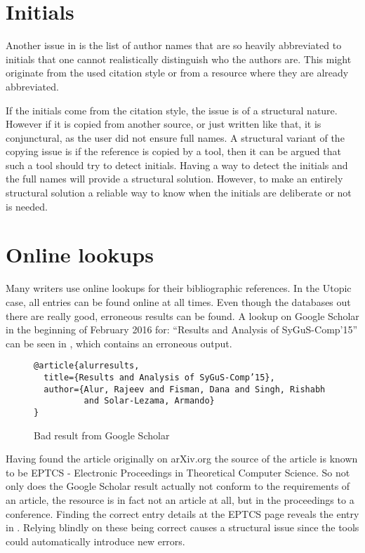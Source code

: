 \section{Initials}
\label{sec:problems_initials}

Another issue in  is the list of author
names that are so heavily abbreviated to initials that one cannot
realistically distinguish who the authors are.  This might originate
from the used citation style or from a resource where they are already
abbreviated.

If the initials come from the citation style, the issue is of a
structural nature.  However if it is copied from another source, or
just written like that, it is conjunctural, as the user did not ensure
full names.  A structural variant of the copying issue is if the
reference is copied by a tool, then it can be argued that such a tool
should try to detect initials.  Having a way to detect the initials
and the full names will provide a structural solution.  However, to
make an entirely structural solution a reliable way to know when the
initials are deliberate or not is needed.


\section{Online lookups}
\label{sec:problems_look_ups}

Many writers use online lookups for their bibliographic references.
In the Utopic case, all entries can be found online at all times.
Even though the databases out there are really good, erroneous results
can be found.  A lookup on Google Scholar in the beginning of February
2016 for: ``Results and Analysis of SyGuS-Comp’15'' can be seen in
, which contains an erroneous output.

\begin{figure}
  \centering
\begin{verbatim}
@article{alurresults,
  title={Results and Analysis of SyGuS-Comp’15},
  author={Alur, Rajeev and Fisman, Dana and Singh, Rishabh
          and Solar-Lezama, Armando}
}
\end{verbatim}
  \caption{Bad result from Google Scholar}
\label{fig:scholar_bad_result}
\end{figure}

Having found the article originally on arXiv.org the source of the
article is known to be EPTCS - Electronic Proceedings in Theoretical
Computer Science.  So not only does the Google Scholar result actually
not conform to the requirements of an article, the resource is in fact
not an article at all, but in the proceedings to a conference.
Finding the correct entry details at the EPTCS page reveals the entry
in .  Relying blindly on these being correct
causes a structural issue since the tools could automatically
introduce new errors.

